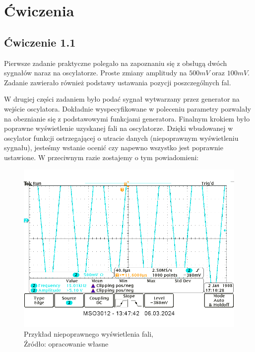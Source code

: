 \documentclass{article}
\begin{document}
  \section{Ćwiczenia}
    \subsection{Ćwiczenie 1.1}
      Pierwsze zadanie praktyczne polegało na zapoznaniu się z obsługą dwóch sygnałów naraz na oscylatorze. Proste zmiany amplitudy na $500mV$ oraz
      $100mV$. Zadanie zawierało również podstawy ustawania pozycji poszczególnych fal.

      \pagebreak

      W drugiej części zadaniem było podać sygnał wytwarzany przez generator na wejście oscylatora. Dokładnie wyspecyfikowane w poleceniu parametry pozwalały na obeznianie się z podstawowymi funkcjami generatora. Finalnym krokiem było poprawne wyświetlenie uzyskanej fali na oscylatorze. Dzięki wbudowanej w oscylator funkcji ostrzegającej o utracie danych (niepoprawnym wyświetleniu sygnału), jesteśmy wstanie ocenić czy napewno wszystko jest poprawnie ustawione. W przeciwnym razie zostajemy o tym powiadomieni:

      \begin{figure}[!ht]
        \begin{center}
            \includegraphics[scale=0.35]{grafiki/clipping_eg.png}
            \caption{Przykład niepoprawnego wyświetlenia fali,\\Źródło: opracowanie własne}
        \end{center}
      \end{figure}
\end{document}
